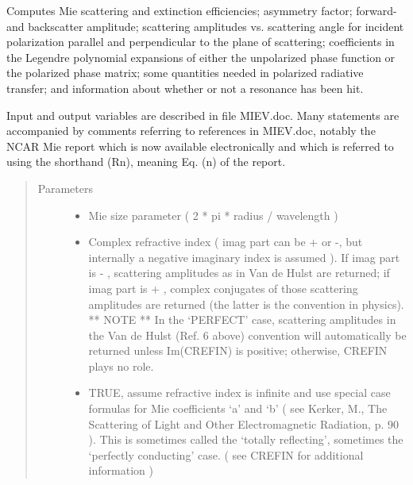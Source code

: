 \documentclass[letterpaper,10pt,english]{sphinxmanual}
\begin{document}
\begin{fulllineitems}
\label{\detokenize{xscat_functions:xscat.miev0}}

Computes Mie scattering and extinction efficiencies; asymmetry
factor;  forward- and backscatter amplitude;  scattering
amplitudes vs. scattering angle for incident polarization parallel
and perpendicular to the plane of scattering;
coefficients in the Legendre polynomial expansions of either the
unpolarized phase function or the polarized phase matrix;
some quantities needed in polarized radiative transfer;  and
information about whether or not a resonance has been hit.

Input and output variables are described in file MIEV.doc.
Many statements are accompanied by comments referring to
references in MIEV.doc, notably the NCAR Mie report which is now
available electronically and which is referred to using the
shorthand (Rn), meaning Eq. (n) of the report.
\begin{quote}\begin{description}
\item[{Parameters}] \leavevmode\begin{itemize}
\item {} 
 \textendash{} Mie size parameter ( 2 * pi * radius / wavelength )

\item {} 
 \textendash{} Complex refractive index ( imag part can be + or -,
but internally a negative imaginary index is assumed ).
If imag part is - ,  scattering amplitudes as in Van
de Hulst are returned;  if imag part is + , complex
conjugates of those scattering amplitudes are returned
(the latter is the convention in physics).
** NOTE ** In the ‘PERFECT’ case, scattering amplitudes
in the Van de Hulst (Ref. 6 above) convention will
automatically be returned unless  Im(CREFIN)  is
positive;  otherwise, CREFIN plays no role.

\item {} 
 \textendash{} TRUE, assume refractive index is infinite and use
special case formulas for Mie coefficients  ‘a’
and  ‘b’  ( see Kerker, M., The Scattering of
Light and Other Electromagnetic Radiation, p. 90 ).
This is sometimes called the ‘totally reflecting’,
sometimes the ‘perfectly conducting’ case.
( see CREFIN for additional information )


\end{itemize}
\end{description}
\end{quote}
\end{fulllineitems}
\end{document}
